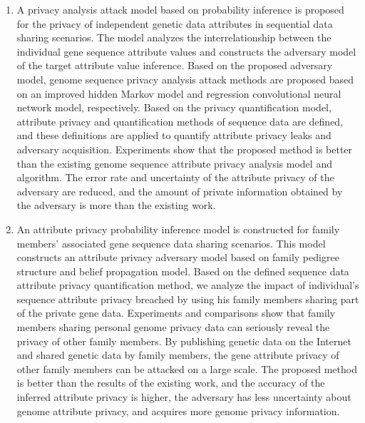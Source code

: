 \begin{englishabstract}
\begin{enumerate}
		\item 	
		A privacy analysis attack model based on probability inference is proposed for the privacy of independent genetic data attributes in sequential data sharing scenarios. The model analyzes the interrelationship between the individual gene sequence attribute values and constructs the adversary model of the target attribute value inference. Based on the proposed adversary model, genome sequence privacy analysis attack methods are proposed based on an improved hidden Markov model and regression convolutional neural network model, respectively. Based on the privacy quantification model, attribute privacy and quantification methods of sequence data are defined, and these definitions are applied to quantify attribute privacy leaks and adversary acquisition. Experiments show that the proposed method is better than the existing genome sequence attribute privacy analysis model and algorithm. The error rate and uncertainty of the attribute privacy of the adversary are reduced, and the amount of private information obtained by the adversary is more than the existing work.
		
		\item 	
		An attribute privacy probability inference model is constructed for family members' associated gene sequence data sharing scenarios. This model constructs an attribute privacy adversary model based on family pedigree structure and belief propagation model. Based on the defined sequence data attribute privacy quantification method, we analyze the impact of individual's sequence attribute privacy breached by using his family members sharing part of the private gene data. Experiments and comparisons show that family members sharing personal genome privacy data can seriously reveal the privacy of other family members. By publishing genetic data on the Internet and shared genetic data by family members, the gene attribute privacy of other family members can be attacked on a large scale. The proposed method is better than the results of the existing work, and the accuracy of the inferred attribute privacy is higher, the adversary has less uncertainty about genome attribute privacy, and acquires more genome privacy information.
		

\end{enumerate}
\end{englishabstract}
